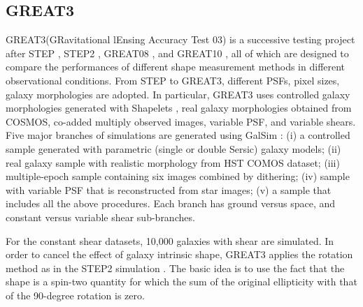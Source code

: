 \documentclass[apj]{emulateapj}
\begin{document}
\subsection{GREAT3 }

GREAT3(GRavitational lEnsing Accuracy Test 03) 
\citep{Mandelbaum2014} is a successive testing project after
STEP \citep[Shear TEsting Program,][]{Heymans2005}, STEP2
\citep{Massey2007}, GREAT08 \citep{Bridle2009}, and GREAT10
\citep{Kitching2010}, all of which are designed to compare the 
performances of different shape measurement methods in different 
observational conditions. From STEP to GREAT3, different PSFs, 
pixel sizes, galaxy morphologies are adopted. In particular, 
GREAT3 uses controlled galaxy morphologies generated with 
Shapelets \citep{Refregier2003}, real galaxy morphologies obtained 
from COSMOS, co-added multiply observed images, variable PSF, 
and variable shears. Five major branches of simulations are 
generated using GalSim \citep{Rowe2015}:
(i) a controlled sample generated with parametric (single or double Sersic) 
galaxy models; (ii) real galaxy sample with realistic morphology 
from HST COMOS dataset; (iii) multiple-epoch sample containing six
images combined by dithering; (iv) sample with variable PSF 
that is reconstructed from star images;  (v) a sample that includes all the
above procedures.  Each branch has ground versus space, 
and constant versus variable shear sub-branches.

 
For the constant shear datasets, 10,000 galaxies with shear are
simulated. In order to cancel the effect of galaxy intrinsic shape,
GREAT3 applies the rotation method as in the STEP2 simulation
\citep{Massey2007}. The basic idea is to use the fact that the 
shape is a spin-two quantity for which the sum of the original ellipticity 
with that of the 90-degree rotation is zero.
\end{document}

